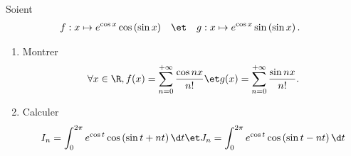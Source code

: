 \begin{enonce}
\begin{exercise}[ID={RMS124 E1258 TPE},subtitle={},tags={}, difficulty={0}]
Soient 
\begin{align*}
f&: x\mapsto e^{\cos x}\cos\left( \sin x \right)&
&\et&
g&: x\mapsto e^{\cos x}\sin\left( \sin x \right).
\end{align*}
\begin{enumerate}
  \item Montrer 
  \begin{equation*}
    \forall x\in\R,
    f(x) = \sum_{n=0}^{+\infty} \frac{\cos nx}{n!}
    \et
    g(x)=\sum_{n=0}^{+\infty} \frac{\sin nx}{n!}.
  \end{equation*}
  \item Calculer
    \begin{equation*}
      I_n = \int_0^{2\pi} e^{\cos t}\cos\left( \sin t + nt \right)\d t
      \et
      J_n = \int_0^{2\pi} e^{\cos t}\cos\left( \sin t - nt \right)\d t
    \end{equation*}
\end{enumerate}
\end{exercise}
\begin{solution}
\end{solution}
\end{enonce}
